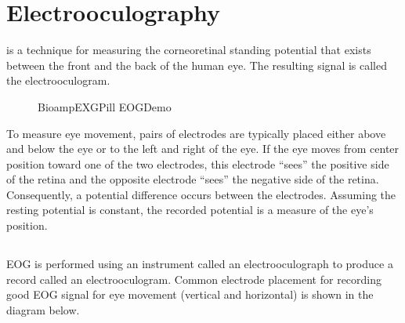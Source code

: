 \documentclass[a4paper,10pt,english,oneside]{sphinxmanual}
\let\sphinxpxdimen\pdfpxdimen\else\newdimen\sphinxpxdimen
\begin{document}
\begin{DUlineblock}{0em}
\item[] 
\end{DUlineblock}


\section{Electrooculography}
\label{\detokenize{applications/index:electrooculography}}\label{\detokenize{applications/index:open3}}
\sphinxAtStartPar
{} is a technique for measuring the corneo\sphinxhyphen{}retinal standing potential that exists between the front and the back of the human eye. The resulting signal is called the electrooculogram.

\begin{figure}[htbp]
\centering
\capstart

\noindent\sphinxincludegraphics[width=600\sphinxpxdimen]{{bioamp-exg-pill-eog-demo}.jpg}
\caption{Bioamp\sphinxhyphen{}EXG\sphinxhyphen{}Pill EOG\sphinxhyphen{}Demo}\label{\detokenize{applications/index:id21}}\end{figure}

\begin{DUlineblock}{0em}
\item[] 
\end{DUlineblock}

\sphinxAtStartPar
To measure eye movement, pairs of electrodes are typically placed either above and below the eye or to the left and right of the eye. If the eye moves from center position toward one of the two electrodes, this electrode “sees” the positive side of the retina and the opposite electrode “sees” the negative side of the retina. Consequently, a potential difference occurs between the electrodes. Assuming the resting potential is constant, the recorded potential is a measure of the eye’s position.

\begin{DUlineblock}{0em}
\item[] 
\end{DUlineblock}


\subsection{}
\label{\detokenize{applications/index:how-to-create-an-electrooculograph-with-bioamp-exg-pill}}
\sphinxAtStartPar
EOG is performed using an instrument called an electrooculograph to produce a record called an electrooculogram. Common electrode placement for recording good EOG signal for eye movement (vertical and horizontal) is shown in the diagram below.
\end{document}
